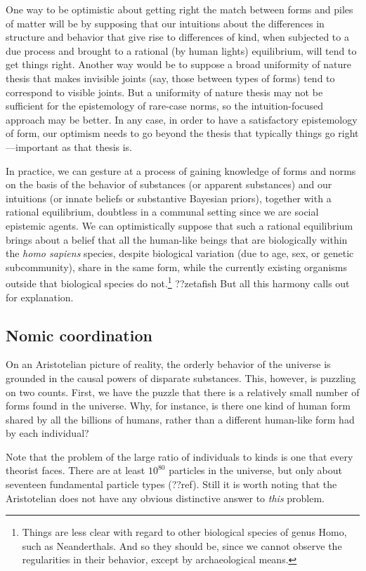 One way to be optimistic about getting right the match between forms and piles of matter will be by supposing that 
our intuitions about the differences in structure and behavior that give rise to differences of kind, when subjected 
to a due process and brought to a rational (by human lights) equilibrium, will tend to get things right. Another way 
would be to suppose a broad uniformity of nature thesis that makes invisible joints (say, those between types of forms) tend to 
correspond to visible joints. But a uniformity of nature thesis may not be sufficient for the epistemology of rare-case 
norms, so the intuition-focused approach may be better. In any case, in order to have a satisfactory epistemology of form,
our optimism needs to go beyond the thesis that typically things go right---important as that thesis is.

In practice, we can gesture at a process of gaining knowledge of forms and norms on the basis of the behavior of 
substances (or apparent substances) and our intuitions (or innate beliefs or substantive Bayesian priors), together 
with a rational equilibrium, doubtless in a communal setting since we are social epistemic agents. We can optimistically
suppose that such a rational equilibrium brings about a belief that all the human-like beings that are biologically 
within the \textit{homo sapiens} species, despite biological variation (due to age, sex, or genetic subcommunity), share 
in the same form, while the currently existing organisms outside that biological species do not.\footnote{Things are less
clear with regard to other biological species of genus Homo, such as Neanderthals. And so they should be, since we cannot
observe the regularities in their behavior, except by archaeological means.} ??zetafish But all this harmony calls out
for explanation.

\subsection{Nomic coordination}
On an Aristotelian picture of reality, the orderly behavior of the universe is grounded in the causal powers of 
disparate substances. This, however, is puzzling on two counts. First, we have the puzzle that there is a 
relatively small number of forms found in the universe. Why, for instance, is there one kind of human form shared by all 
the billions of humans, rather than a different human-like form had by each individual? 

Note that the problem of the large ratio of individuals to kinds is one that every theorist faces. There are at least $10^{80}$ 
particles in the universe, but only about seventeen fundamental particle types (??ref). Still it is worth noting that the 
Aristotelian does not have any obvious distinctive answer to \textit{this} problem. 

